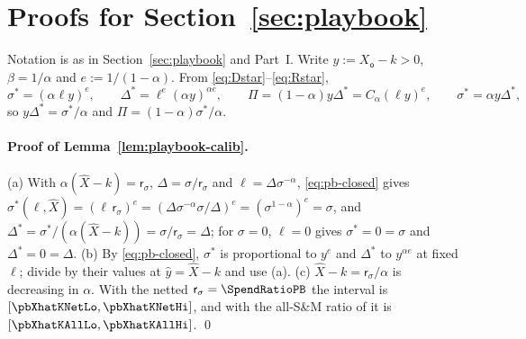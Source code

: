 \section{Proofs for Section~\ref{sec:playbook}}\label{app:proofs-playbook}

Notation is as in Section~\ref{sec:playbook} and Part~I. Write $y:=X_{\mathsf o}-k>0$, $\beta=1/\alpha$ and $e:=1/(1-\alpha)$. From \eqref{eq:Dstar}--\eqref{eq:Rstar},
\begin{equation}\label{eq:pb-closed}
\sigma^*=(\alpha\ell y)^{e},\qquad \Delta^*=\ell^{e}(\alpha y)^{\alpha e},\qquad \Pi=(1-\alpha)y\Delta^*=C_\alpha(\ell y)^{e},\qquad \sigma^*=\alpha y\Delta^* ,
\end{equation}
so $y\Delta^*=\sigma^*/\alpha$ and $\Pi=(1-\alpha)\sigma^*/\alpha$.

\paragraph{Proof of Lemma~\ref{lem:playbook-calib}.}
(a) With $\alpha(\hat X-k)=\mathsf r_\sigma$, $\Delta=\sigma/\mathsf r_\sigma$ and $\ell=\Delta\sigma^{-\alpha}$, \eqref{eq:pb-closed} gives $\sigma^*(\ell,\hat X)=(\ell\,\mathsf r_\sigma)^{e}=(\Delta\sigma^{-\alpha}\sigma/\Delta)^{e}=(\sigma^{1-\alpha})^{e}=\sigma$, and $\Delta^*=\sigma^*/(\alpha(\hat X-k))=\sigma/\mathsf r_\sigma=\Delta$; for $\sigma=0$, $\ell=0$ gives $\sigma^*=0=\sigma$ and $\Delta^*=0=\Delta$. (b) By \eqref{eq:pb-closed}, $\sigma^*$ is proportional to $y^{e}$ and $\Delta^*$ to $y^{\alpha e}$ at fixed $\ell$; divide by their values at $\hat y=\hat X-k$ and use (a). (c) $\hat X-k=\mathsf r_\sigma/\alpha$ is decreasing in $\alpha$. With the netted $\mathsf r_\sigma=\SpendRatioPB$ the interval is $[\pbXhatKNetLo,\pbXhatKNetHi]$, and with the all-S\&M ratio of \SpendRatioPBAll{} it is $[\pbXhatKAllLo,\pbXhatKAllHi]$. \qed

